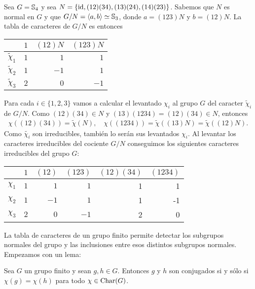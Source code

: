 \begin{example}
    Sea $G=\mathbb{S}_4$ y sea $N=\{\operatorname{id},(12)(34),(13)(24),(14)(23)\}$. Sabemos que $N$ es normal en $G$ 
    y que $G/N=\langle a,b\rangle\simeq\mathbb{S}_3$, donde 
    $a=(123)N$ y $b=(12)N$. La tabla de caracteres de $G/N$ es entonces
    	\begin{center}
		\begin{tabular}{|c|rrr|}
			\hline
			& $1$ & $(12)N$ & $(123)N$ \tabularnewline
			\hline 
			$\widetilde{\chi}_{1}$ & $1$ & $1$ & $1$\tabularnewline
			$\widetilde{\chi}_{2}$ & $1$ & $-1$ & $1$ \tabularnewline
			$\widetilde{\chi}_{3}$ & $2$ & $0$ & $-1$ \tabularnewline
			\hline
		\end{tabular}
	\end{center}
    Para cada $i\in\{1,2,3\}$ vamos a calcular el levantado $\chi_i$ al grupo $G$ 
    del caracter $\widetilde{\chi}_i$ de $G/N$. 
    Como $(12)(34)\in N$ y $(13)(1234)=(12)(34)\in N$, entonces
    \begin{align*}
        \chi( (12)(34) )=\widetilde{\chi}(N),\quad
        \chi( (1234) )=\widetilde{\chi}((13)N)=\widetilde{\chi}((12)N).
    \end{align*}
    Como $\widetilde{\chi_i}$ son irreducibles, también lo serán sus levantados $\chi_i$. 
    Al levantar los caracteres irreducibles del cociente $G/N$ 
    conseguimos los siguientes caracteres irreducibles del grupo $G$: 
    	\begin{center}
		\begin{tabular}{|c|rrrrr|}
			\hline
			& $1$ & $(12)$ & $(123)$ & $(12)(34)$ & $(1234)$ \tabularnewline
			\hline 
			$\chi_{1}$ & $1$ & $1$ & $1$ & 1 & 1\tabularnewline
			$\chi_{2}$ & $1$ & $-1$ & $1$ & 1 & -1 \tabularnewline
			$\chi_{3}$ & $2$ & $0$ & $-1$ & 2 & 0\tabularnewline
			\hline
		\end{tabular}
	\end{center}
\end{example}

La tabla de caracteres de un grupo finito permite detectar los subgrupos normales del grupo y 
las inclusiones entre esos distintos subgrupos normales. Empezamos con un lema:

\begin{lemma}
    Sea $G$ un grupo finito y sean 
    $g,h\in G$. Entonces $g$ y $h$ son conjugados si y sólo si $\chi(g)=\chi(h)$ para todo $\chi\in\operatorname{Char}(G)$. 
\end{lemma}

